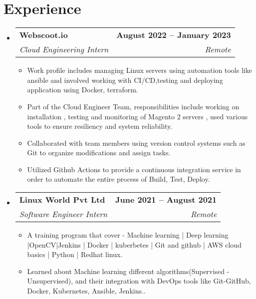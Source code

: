 \documentclass[letterpaper,11pt]{article}
\makeatletter
\newcommand{\resumeItem}[1]{
  \item\small{
    {#1 \vspace{-2pt}}
  }
}
\newcommand{\resumeSubheading}[4]{
  \vspace{-2pt}\item
    \begin{tabular*}{1.0\textwidth}[t]{l@{\extracolsep{\fill}}r}
      \textbf{#1} & \textbf{\small #2} \\
      \textit{\small#3} & \textit{\small #4} \\
    \end{tabular*}\vspace{-7pt}
}
\newcommand{\resumeSubHeadingListStart}{\begin{itemize}[leftmargin=0.0in, label={}]}
\newcommand{\resumeSubHeadingListEnd}{\end{itemize}}
\newcommand{\resumeItemListStart}{\begin{itemize}}
\newcommand{\resumeItemListEnd}{\end{itemize}\vspace{-5pt}}
\makeatother
\begin{document}
\section{Experience}
  \resumeSubHeadingListStart
    \resumeSubheading
      {Webscoot.io}{August 2022 -- January 2023}
      {Cloud Engineering Intern}{Remote}
      \resumeItemListStart
        \resumeItem{Work profile includes managing Linux servers using automation tools like ansible and involved working with CI/CD,testing and deploying application using Docker, terraform.}
        \resumeItem{Part of the Cloud Engineer Team, responsibilities include working on installation , testing and monitoring of Magento 2 servers , used various tools to ensure resiliency and system reliability.}
        \resumeItem{Collaborated with team members using version control systems such as Git to organize modifications and assign tasks.}
        \resumeItem{Utilized Github Actions to provide a continuous integration service in order to automate the entire process of Build, Test, Deploy.}
    \resumeItemListEnd
    \resumeSubheading
      {Linux World Pvt Ltd}{June 2021 -- August 2021}
      {Software Engineer Intern}{Remote}
      \resumeItemListStart
        \resumeItem{A training program that cover - Machine learning | Deep learning |OpenCV|Jenkins | Docker | kuberbetes | Git and github | AWS cloud basics | Python | Redhat linux.}
        \resumeItem{Learned about Machine learning different algorithms(Supervised - Unsupervised), and their integration with DevOps tools like Git-GitHub, Docker, Kubernetes, Ansible, Jenkins..}
      \resumeItemListEnd    
  \resumeSubHeadingListEnd
\vspace{-16pt}

\end{document}
